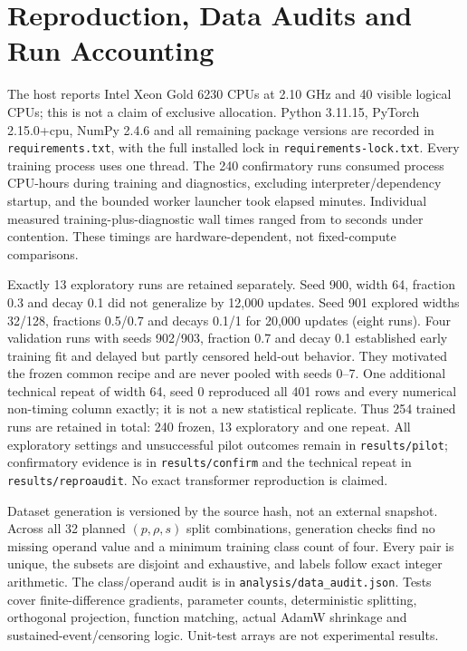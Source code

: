 \documentclass{article}
\begin{document}



\clearpage\appendix
\section{Reproduction, Data Audits and Run Accounting}\label{app:repro}
The host reports Intel Xeon Gold 6230 CPUs at 2.10 GHz and 40 visible logical CPUs; this is not a claim of exclusive allocation. Python 3.11.15, PyTorch 2.15.0+cpu, NumPy 2.4.6 and all remaining package versions are recorded in \texttt{requirements.txt}, with the full installed lock in \texttt{requirements-lock.txt}. Every training process uses one thread. The 240 confirmatory runs consumed \CPUHours{} process CPU-hours during training and diagnostics, excluding interpreter/dependency startup, and the bounded worker launcher took \ElapsedMinutes{} elapsed minutes. Individual measured training-plus-diagnostic wall times ranged from \RunSecondsMin{} to \RunSecondsMax{} seconds under contention. These timings are hardware-dependent, not fixed-compute comparisons.

Exactly 13 exploratory runs are retained separately. Seed 900, width 64, fraction 0.3 and decay 0.1 did not generalize by 12,000 updates. Seed 901 explored widths 32/128, fractions 0.5/0.7 and decays 0.1/1 for 20,000 updates (eight runs). Four validation runs with seeds 902/903, fraction 0.7 and decay 0.1 established early training fit and delayed but partly censored held-out behavior. They motivated the frozen common recipe and are never pooled with seeds 0--7. One additional technical repeat of width 64, seed 0 reproduced all 401 rows and every numerical non-timing column exactly; it is not a new statistical replicate. Thus 254 trained runs are retained in total: 240 frozen, 13 exploratory and one repeat. All exploratory settings and unsuccessful pilot outcomes remain in \texttt{results/pilot}; confirmatory evidence is in \texttt{results/confirm} and the technical repeat in \texttt{results/reproaudit}. No exact transformer reproduction is claimed.

Dataset generation is versioned by the source hash, not an external snapshot. Across all 32 planned $(p,\rho,s)$ split combinations, generation checks find no missing operand value and a minimum training class count of four. Every pair is unique, the subsets are disjoint and exhaustive, and labels follow exact integer arithmetic. The class/operand audit is in \texttt{analysis/data\_audit.json}. Tests cover finite-difference gradients, parameter counts, deterministic splitting, orthogonal projection, function matching, actual AdamW shrinkage and sustained-event/censoring logic. Unit-test arrays are not experimental results.
\end{document}
